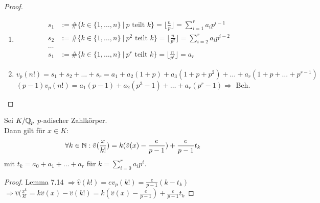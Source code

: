 \begin{proof}
\begin{enumerate}[(1)]
\item \begin{align*}
s_1&:=\#\{k \in \{1, \dots, n\} \ | \ p \text{ teilt } k \} = \lfloor \frac{n}{p} \rfloor = \sum_{i=1}^r a_i p^{i-1}\\
s_2&:=\#\{k \in \{1, \dots, n\} \ | \ p^2 \text{ teilt } k \} = \lfloor \frac{n}{p^2} \rfloor = \sum_{i=2}^r a_i p^{i-2}\\
\dots\\
s_1&:=\#\{k \in \{1, \dots, n\} \ | \ p^r \text{ teilt } k \} = \lfloor \frac{n}{p^r} \rfloor = a_r
\end{align*}
\item $v_p(n!)=s_1+s_2+\dots + s_r = a_1+a_2(1+p)+a_3(1+p+p^2)+\dots+a_r(1+p+\dots+p^{r-1})$\\
$(p-1)v_p(n!)=a_1(p-1)+a_2(p^3-1)+\dots+a_r(p^r-1) \Rightarrow$ Beh.
\end{enumerate}
\end{proof}

\begin{Lem}
Sei $K/\mathbb{Q}_p$ $p$-adischer Zahlkörper.\\
Dann gilt für $x \in K:$
\[\forall k \in \mathbb{N}: \hat v (\frac{x}{k!})=k(\hat v(x)-\frac{e}{p-1}) + \frac{e}{p-1}t_k\]
mit $t_k=a_0+a_1+\dots+a_r$ für $k=\sum_{i=0}^r a_i p^i$.
\end{Lem}

\begin{proof}
Lemma 7.14 $\Rightarrow \hat{v}(k!)= e v_p(k!)=\frac{e}{p-1}(k-t_k)$\\
$\Rightarrow \hat{v}(\frac{x^k}{k!}=k \hat{v}(x)-\hat{v}(k!)=k(\hat{v}(x)-\frac{e}{p-1})+\frac{e}{p-1}t_k$
\end{proof}

